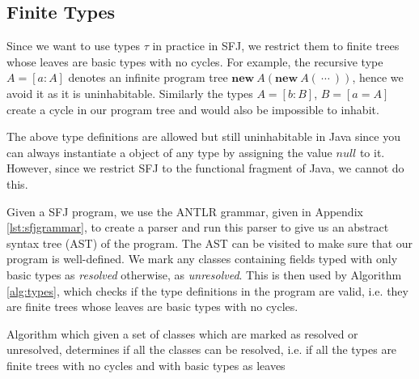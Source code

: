 \documentclass{l4proj}
\begin{document}
\subsection{Finite Types}

Since we want to use types $\tau$ in practice in SFJ, we restrict them to finite trees whose leaves are basic types with no cycles.
For example, the recursive type $A = [a : A]$ denotes an infinite program tree $\textbf{new}\ A(\textbf{new}\ A(\ \cdots\ ))$, hence we avoid it as it is uninhabitable.
Similarly the types $A = [b: B]$, $B = [a = A]$ create a cycle in our program tree and would also be impossible to inhabit.

The above type definitions are allowed but still uninhabitable in Java since you can always instantiate a object of any type by assigning the value $null$ to it.
However, since we restrict SFJ to the functional fragment of Java, we cannot do this.

Given a SFJ program, we use the ANTLR grammar, given in Appendix \ref{lst:sfjgrammar}, to create a parser and run this parser to give us an abstract syntax tree (AST) of the program.
The AST can be visited to make sure that our program is well-defined.
We mark any classes containing fields typed with only basic types as \emph{resolved} otherwise, as \emph{unresolved}.
This is then used by Algorithm \ref{alg:types}, which checks if the type definitions in the program are valid, i.e. they are finite trees whose leaves are basic types with no cycles.

\begin{algorithm}
    \caption{Algorithm which given a set of classes which are marked as resolved or unresolved, determines if all the classes can be resolved, i.e. if all the types are finite trees with no cycles and with basic types as leaves}
    \label{alg:types}

    \DontPrintSemicolon
\end{algorithm}
\end{document}
